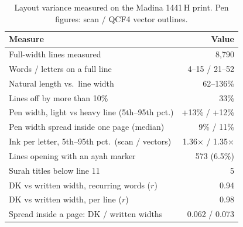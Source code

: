 \documentclass[sigconf,nonacm]{acmart}
\newcommand{\x}{\ensuremath{\times}}
\begin{document}
\begin{table}[t]
  \centering\small
  \caption{Layout variance measured on the Madina 1441\,H print. Pen figures: scan / QCF4 vector outlines.}
  \label{tab:madina}
  \begin{tabularx}{\linewidth}{@{}Xr@{}}
    \toprule
    Measure & Value \\
    \midrule
    Full-width lines measured & 8{,}790 \\
    Words / letters on a full line & 4--15 / 21--52 \\
    Natural length vs.\ line width & 62--136\% \\
    Lines off by more than 10\% & 33\% \\
    Pen width, light vs heavy line (5th--95th pct.) & +13\% / +12\% \\
    Pen width spread inside one page (median) & 9\% / 11\% \\
    Ink per letter, 5th--95th pct.\ (scan / vectors) & 1.36\x{} / 1.35\x \\
    Lines opening with an ayah marker & 573 (6.5\%) \\
    Surah titles below line 11 & 5 \\
    \midrule
    DK vs written width, recurring words ($r$) & 0.94 \\
    DK vs written width, per line ($r$) & 0.98 \\
    Spread inside a page: DK / written widths & 0.062 / 0.073 \\
    \bottomrule
  \end{tabularx}
\end{table}
\end{document}
